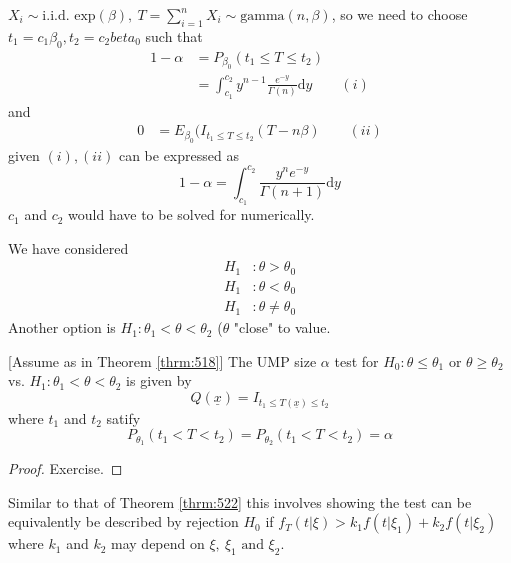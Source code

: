 \documentclass[english, 11pt]{article}
\begin{document}
\begin{exmp}\label{exmp:523}
$X_i\sim\text{i.i.d. exp}(\beta), ~T=\sum_{i=1}^nX_i\sim\text{gamma}(n, \beta)$, so we need to choose $t_1=c_1\beta_0, t_2=c_2beta_0$ such that 
$$\begin{aligned}
1-\alpha&=P_{\beta_0}(t_1\leq T\leq t_2)\\
&=\int_{c_1}^{c_2}y^{n-1}\frac{e^{-y}}{\Gamma(n)}\mathrm{d}y\qquad(i)
\end{aligned}$$
and
$$\begin{aligned}
0&=E_{\beta_0}(I_{t_1\leq T\leq t_2}(T-n\beta)\qquad(ii)
\end{aligned}$$
given $(i), (ii)$ can be expressed as
$$
1-\alpha=\int_{c_1}^{c_2}\frac{y^ne^{-y}}{\Gamma(n+1)}\mathrm{d}y
$$
$c_1$ and $c_2$ would have to be solved for numerically.
\end{exmp}


We have considered 
$$\begin{aligned}
H_1&:\theta>\theta_0\\
H_1&:\theta<\theta_0\\
H_1&:\theta\not=\theta_0
\end{aligned}$$
Another option is $H_1:\theta_1<\theta<\theta_2$ ($\theta$ "close" to value.

\begin{thrm}\label{thrm:524}[Assume as in Theorem \ref{thrm:518}]
The UMP size $\alpha$ test for $H_0:\theta\leq\theta_1$ or $\theta\geq\theta_2$ vs. $H_1:\theta_1<\theta<\theta_2$ is given by
$$
Q(\underline{x})=I_{t_1\leq T(\underline{x})\leq t_2}
$$
where $t_1$ and $t_2$ satify
$$
P_{\theta_1}(t_1<T<t_2)=P_{\theta_2}(t_1<T<t_2)=\alpha
$$
\end{thrm}



\begin{proof}
Exercise.
\end{proof}


Similar to that of Theorem \ref{thrm:522}  this involves showing the test can be equivalently be described by rejection $H_0$ if $f_T(t|\xi)>k_1f(t|\xi_1)+k_2f(t|\xi_2)$ where $k_1$ and $k_2$ may depend on $\xi, ~\xi_1\text{ and }\xi_2$.
\end{document}
